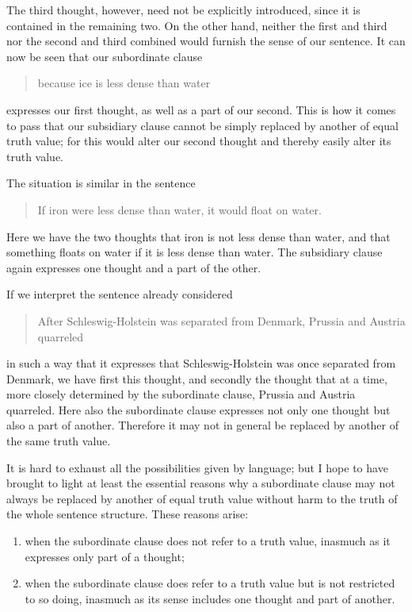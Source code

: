 \documentclass[twoside,12pt]{article}
\begin{document}
The third thought, however, need not be explicitly introduced, since
it is contained in the remaining two. On the other hand, neither the
first and third nor the second and third combined would furnish the
sense of our sentence. It can now be seen that our subordinate clause

\begin{quote}
  because ice is less dense than water
\end{quote}

\noindent expresses our first thought, as well as a part of our second. This is
how it comes to pass that our subsidiary clause cannot be simply
replaced by another of equal truth value; for this would alter our
second thought and thereby easily alter its truth value.

The situation is similar in the sentence

\begin{quote}
  If iron were less dense than water, it would float on water.
\end{quote}

Here we have the two thoughts that iron is not less dense than water,
and that something floats on water if it is less dense than water. The
subsidiary clause again expresses one thought and a part of the other.

If we interpret the sentence already considered

\begin{quote}
  After Schleswig-Holstein was separated from Denmark, Prussia and
  Austria quarreled
\end{quote}

\noindent in such a way that it expresses that Schleswig-Holstein was
once separated from Denmark, we have first this thought, and secondly
the thought that at a time, more closely determined by the subordinate
clause, Prussia and Austria quarreled. Here also the subordinate
clause expresses not only one thought but also a part of another.
Therefore it may not in general be replaced by another of the same
truth value.

It is hard to exhaust all the possibilities given by language; but I
hope to have brought to light at least the essential reasons why a
subordinate clause may not always be replaced by another of equal
truth value without harm to the truth of the whole sentence structure.
These reasons arise:

\begin{enumerate}[label={(\arabic*)}]
\item when the subordinate clause does not refer to a truth value,
  inasmuch as it expresses only part of a thought;
\item when the subordinate clause does refer to a truth value but is
  not restricted to so doing, inasmuch as its sense includes one
  thought and part of another.
\end{enumerate}
\end{document}
